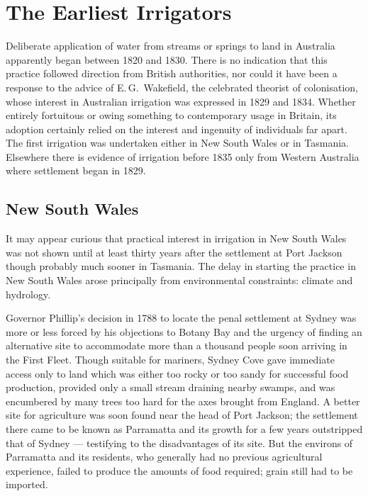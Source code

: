 
\setcounter{endnote}{0}

\chapter{The Earliest Irrigators}
\label{ch:early}

Deliberate application of water from streams or springs to land in
Australia apparently began between 1820 and 1830.  There is no
indication that this practice followed direction from British
authorities, nor could it have been a response to the advice of
E.\,G.~Wakefield, the celebrated theorist of colonisation, whose
interest in Australian irrigation was expressed in 1829 and 1834.
Whether entirely fortuitous or owing something to contemporary usage
in Britain, its adoption certainly relied on the interest and
ingenuity of individuals far apart.  The first irrigation was
undertaken either in New South Wales or in Tasmania.  Elsewhere there
is evidence of irrigation before 1835 only from Western Australia
where settlement began in 1829.

\section*{New South Wales}
\label{sec:nsw}

It may appear curious that practical interest in irrigation in New
South Wales was not shown until at least thirty years after the
settlement at Port Jackson though probably much sooner in Tasmania.
The delay in starting the practice in New South Wales arose
principally from environmental constraints: climate and hydrology.

Governor Phillip's decision in 1788 to locate the penal settlement at
Sydney was more or less forced by his objections to Botany Bay and the
urgency of finding an alternative site to accommodate more than a
thousand people soon arriving in the First Fleet.  Though suitable for
mariners, Sydney Cove gave immediate access only to land which was
either too rocky or too sandy for successful food production, provided
only a small stream draining nearby swamps, and was encumbered by many
trees too hard for the axes brought from England.  A better site for
agriculture was soon found near the head of Port Jackson; the
settlement there came to be known as Parramatta and its growth for a
few years outstripped that of Sydney --- testifying to the
disadvantages of its site.  But the environs of Parramatta and its
residents, who generally had no previous agricultural experience,
failed to produce the amounts of food required; grain still had to be
imported.

